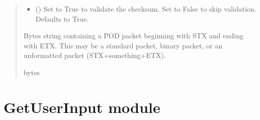 \documentclass[letterpaper,10pt,english]{sphinxmanual}
\begin{document}
\begin{fulllineitems}
\begin{fulllineitems}
\begin{quote}
\begin{description}
\begin{itemize}
\item {} 
\sphinxAtStartPar
{} (\sphinxstyleliteralemphasis{\sphinxupquote{, }}) \textendash{} Set to True to validate the checksum. Set to False to skip                     validation. Defaults to True.

\end{itemize}

\sphinxAtStartPar
Bytes string containing a POD packet beginning with STX and ending with ETX. This may                 be a standard packet, binary packet, or an unformatted packet (STX+something+ETX).

\sphinxAtStartPar
bytes

\end{description}\end{quote}

\end{fulllineitems}


\end{fulllineitems}


\sphinxstepscope


\section{GetUserInput module}
\label{\detokenize{GetUserInput:module-GetUserInput}}\label{\detokenize{GetUserInput:getuserinput-module}}\label{\detokenize{GetUserInput::doc}}
\end{document}
